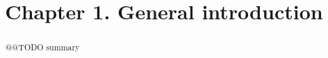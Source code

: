 \documentclass[a4paper,11pt,abstracton,hidelinks]{scrartcl}
\title{
Chapter 1. General introduction
}
\author{}
\begin{document}
\renewcommand{\abstractname}{Summary}


\maketitle


\begin{abstract}


@@TODO summary


\end{abstract}


\printbibliography
\end{document}

